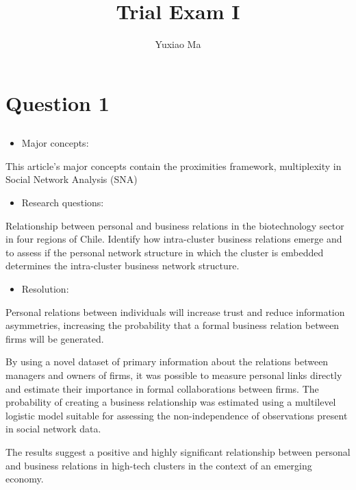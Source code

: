 \documentclass[UTF8,a4paper,AutoFakeBold,AutoFakeSlant]{article}
\title{\textbf{\textsf{{\textsf{Trial Exam I}}}}}
\author{\tnewroman Yuxiao Ma}
\date{}
\begin{document}
\maketitle


\section{Question 1}

\subsection{}

\begin{itemize}
    \item Major concepts:
\end{itemize}

This article's major concepts contain the proximities framework, multiplexity in Social 
Network Analysis (SNA)

\begin{itemize}
    \item Research questions:
\end{itemize}

Relationship between personal and business relations in the 
biotechnology sector in four regions of Chile.
Identify how 
intra-cluster business relations emerge and to assess if the personal network structure in 
which the cluster is embedded determines the intra-cluster business network structure.

\begin{itemize}
    \item Resolution:
\end{itemize}

Personal relations between individuals 
will increase trust and reduce information asymmetries, increasing the probability that a 
formal business relation between firms will be generated.

By using a novel dataset of primary information about the relations between managers and owners of firms, it was possible to 
measure personal links directly and estimate their importance in formal collaborations 
between firms. The probability of creating a business relationship was estimated using 
a multilevel logistic model suitable for assessing the non-independence of observations 
present in social network data.

The results suggest a positive and highly significant relationship between personal and business relations in high-tech clusters in the context of 
an emerging economy.
\end{document}
